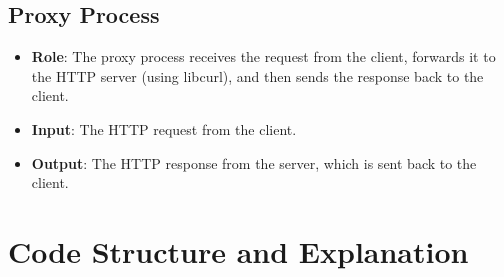 \documentclass[a4paper,12pt]{article}
\begin{document}
\subsection{Proxy Process}
\begin{itemize}
    \item \textbf{Role}: The proxy process receives the request from the client, forwards it to the HTTP server (using libcurl), and then sends the response back to the client.
    \item \textbf{Input}: The HTTP request from the client.
    \item \textbf{Output}: The HTTP response from the server, which is sent back to the client.
\end{itemize}
\section{Code Structure and Explanation}
\end{document}
